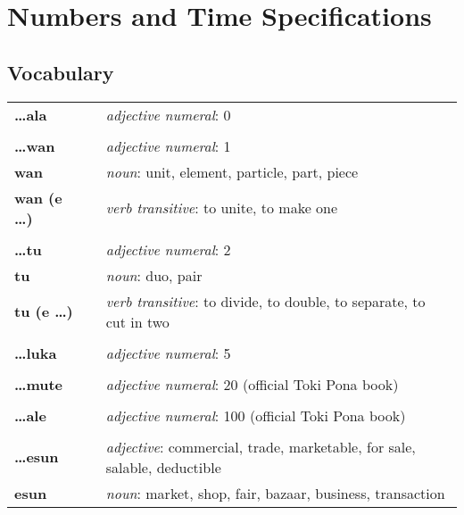 \section{Numbers and Time Specifications}
%
%
\subsection*{Vocabulary}
%
\begin{supertabular}{p{2,5cm}|ll}
%
\textbf{\dots ala} && \textit{adjective numeral}: 0 \\ %
 && \\ %
%
\textbf{\dots wan} && \textit{adjective numeral}: 1 \\ %
\textbf{wan} && \textit{noun}: unit, element, particle, part, piece \\ %
\textbf{wan (e \dots)} && \textit{verb transitive}: to unite, to make one \\ %
 && \\ %
%
\textbf{\dots tu} && \textit{adjective numeral}: 2 \\ %
\textbf{tu} && \textit{noun}: duo, pair \\ %
\textbf{tu (e \dots)} && \textit{verb transitive}: to divide, to double, to separate, to cut in two \\ %
 && \\ %
%
\textbf{\dots luka} && \textit{adjective numeral}: 5 \\ %
 && \\ %
%
\textbf{\dots mute} && \textit{adjective numeral}: 20 (official Toki Pona book) \\ %
 && \\ %
%
\textbf{\dots ale} && \textit{adjective numeral}: 100 (official Toki Pona book) \\ %
 && \\ %
%
\textbf{\dots esun} && \textit{adjective}: commercial, trade, marketable, for sale, salable, deductible \\  %
\textbf{esun} && \textit{noun}: market, shop, fair, bazaar, business, transaction \\ %

\end{supertabular}

